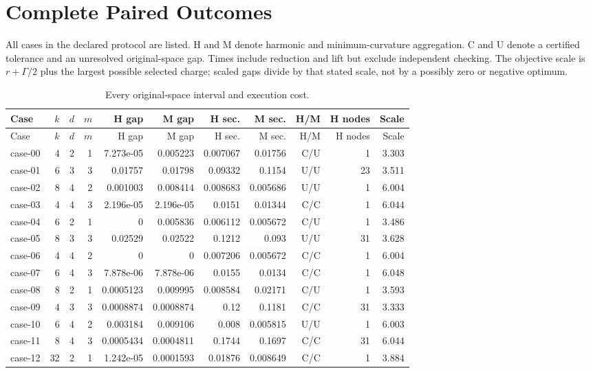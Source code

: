 \section{Complete Paired Outcomes}\label{sec:r48-record}
All cases in the declared protocol are listed. H and M denote harmonic and minimum-curvature aggregation. C and U denote a certified tolerance and an unresolved original-space gap. Times include reduction and lift but exclude independent checking. The objective scale is $r+\Gamma/2$ plus the largest possible selected charge; scaled gaps divide by that stated scale, not by a possibly zero or negative optimum.
\begin{longtable}{lrrrrrrrrrr}
\caption{Every original-space interval and execution cost.}\label{tab:r48-all}\\
\toprule Case & $k$ & $d$ & $m$ & H gap & M gap & H sec. & M sec. & H/M & H nodes & Scale\\\midrule\endfirsthead
\toprule Case & $k$ & $d$ & $m$ & H gap & M gap & H sec. & M sec. & H/M & H nodes & Scale\\\midrule\endhead
case-00 & 4 & 2 & 1 & 7.273e-05 & 0.005223 & 0.007067 & 0.01756 & C/U & 1 & 3.303 \\
case-01 & 6 & 3 & 3 & 0.01757 & 0.01798 & 0.09332 & 0.1154 & U/U & 23 & 3.511 \\
case-02 & 8 & 4 & 2 & 0.001003 & 0.008414 & 0.008683 & 0.005686 & U/U & 1 & 6.004 \\
case-03 & 4 & 4 & 3 & 2.196e-05 & 2.196e-05 & 0.0151 & 0.01344 & C/C & 1 & 6.044 \\
case-04 & 6 & 2 & 1 & 0 & 0.005836 & 0.006112 & 0.005672 & C/U & 1 & 3.486 \\
case-05 & 8 & 3 & 3 & 0.02529 & 0.02522 & 0.1212 & 0.093 & U/U & 31 & 3.628 \\
case-06 & 4 & 4 & 2 & 0 & 0 & 0.007206 & 0.005672 & C/C & 1 & 6.004 \\
case-07 & 6 & 4 & 3 & 7.878e-06 & 7.878e-06 & 0.0155 & 0.0134 & C/C & 1 & 6.048 \\
case-08 & 8 & 2 & 1 & 0.0005123 & 0.009995 & 0.008584 & 0.02171 & C/U & 1 & 3.593 \\
case-09 & 4 & 3 & 3 & 0.0008874 & 0.0008874 & 0.12 & 0.1181 & C/C & 31 & 3.333 \\
case-10 & 6 & 4 & 2 & 0.003184 & 0.009106 & 0.008 & 0.005815 & U/U & 1 & 6.003 \\
case-11 & 8 & 4 & 3 & 0.0005434 & 0.0004811 & 0.1744 & 0.1697 & C/C & 31 & 6.044 \\
case-12 & 32 & 2 & 1 & 1.242e-05 & 0.0001593 & 0.01876 & 0.008649 & C/C & 1 & 3.884 \\

\end{longtable}

